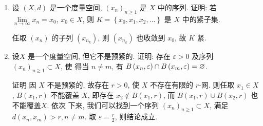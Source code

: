 \begin{enumerate}
\begin{answer}
        \end{answer}
    \item 设 $(X, d)$ 是一个度量空间, $\left(x_{n}\right)_{n \geq 1}$ 是 $X$ 中的序列. 证明: 若 $\lim \limits_{n \rightarrow \infty} x_{n}=x_{0}$, $x_{0} \in X$, 则 $K=\left\{x_{0}, x_{1}, x_{2}, \ldots\right\}$ 是 $X$ 中的紧子集.
        \begin{answer}
            任取 $\left(x_{n}\right)$ 的子列 $\left(x_{n_{k}}\right)$, 则 $\left(x_{n_{k}}\right)$ 也收敛到 $x_{0}$, 故 $K$ 紧.
        \end{answer}
    \item 设$X$ 是一个度量空间, 但它不是预紧的. 证明: 存在 $\varepsilon>0$ 及序列 $\left(x_{n}\right)_{n \geq 1} \subset X$, 使 得当 $n \neq  m$, 有 $B\left(x_{n}, \varepsilon\right) \cap B\left(x_{m}, \varepsilon\right)=\varnothing$.
        \begin{answer}
            证明 因 $X$ 不是预紧的, 故存在 $r>0$, 使 $X$ 不存在有限的 $r$-网. 则任取 $x_{1} \in X$, $B\left(x_{1}, r\right)$ 不能覆盖 $X$, 即存在 $x_{2} \notin B\left(x_{1}, r\right)$, 而 $B\left(x_{1}, r\right) \cup B\left(x_{2}, r\right)$ 也不能覆盖$X$. 依次 下来, 我们可以找到一个序列 $\left(x_{n}\right)_{n \geq 1} \subset X$, 满足 $d\left(x_{n}, x_{m}\right)>r, n \neq  m$. 取 $\varepsilon=\frac{r}{2}$, 则结论成立.

\end{answer}
\end{enumerate}
